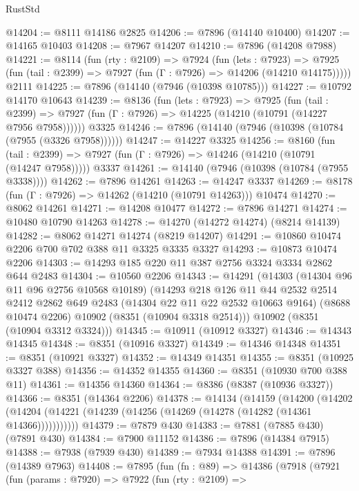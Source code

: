 \begin{lexlean}{RustStd}
\begin{coremodule}
{\begin{coremodule}
{{{{{{{{{{{{{{{{{{{{{{{{{{{{{{{{{{{{{{{{{{{{{{{{{{@14204 := @8111 @14186 @2825
@14206 := @7896 (@14140 @10400)
@14207 := @14165 @10403
@14208 := @7967 @14207
@14210 := @7896 (@14208 @7988)
@14221 := @8114
    (fun (rty : @2109) =>
    @7924
      (fun (lets : @7923) =>
      @7925 (fun (tail : @2399) => @7927 (fun (Γ : @7926) => @14206 (@14210 @14175)))))
    @2111
@14225 := @7896 (@14140 (@7946 (@10398 @10785)))
@14227 := @10792 @14170 @10643
@14239 := @8136
    (fun (lets : @7923) =>
    @7925
      (fun (tail : @2399) =>
      @7927 (fun (Γ : @7926) => @14225 (@14210 (@10791 (@14227 @7956 @7958))))))
    @3325
@14246 := @7896 (@14140 (@7946 (@10398 (@10784 (@7955 (@3326 @7958))))))
@14247 := @14227 @3325
@14256 := @8160
    (fun (tail : @2399) => @7927 (fun (Γ : @7926) => @14246 (@14210 (@10791 (@14247 @7958)))))
    @3337
@14261 := @14140 (@7946 (@10398 (@10784 (@7955 @3338))))
@14262 := @7896 @14261
@14263 := @14247 @3337
@14269 := @8178 (fun (Γ : @7926) => @14262 (@14210 (@10791 @14263))) @10474
@14270 := @8062 @14261
@14271 := @14208 @10477
@14272 := @7896 @14271
@14274 := @10480 @10790 @14263
@14278 := @14270 (@14272 @14274) (@8214 @14139)
@14282 := @8062 @14271 @14274 (@8219 @14207)
@14291 := @10860 @10474 @2206 @700 @702 @388 @11 @3325 @3335 @3327
@14293 := @10873 @10474 @2206
@14303 := @14293 @185 @220 @11 @387 @2756 @3324 @3334 @2862 @644 @2483
@14304 := @10560 @2206
@14343 := @14291
    (@14303
      (@14304 @96 @11 @96 @2756 @10568 @10189)
      (@14293
        @218
        @126
        @11
        @44
        @2532
        @2514
        @2412
        @2862
        @649
        @2483
        (@14304 @22 @11 @22 @2532 @10663 @9164)
        (@8688 @10474 @2206)
        @10902
        (@8351 (@10904 @3318 @2514)))
      @10902
      (@8351 (@10904 @3312 @3324)))
@14345 := @10911 (@10912 @3327)
@14346 := @14343 @14345
@14348 := @8351 (@10916 @3327)
@14349 := @14346 @14348
@14351 := @8351 (@10921 @3327)
@14352 := @14349 @14351
@14355 := @8351 (@10925 @3327 @388)
@14356 := @14352 @14355
@14360 := @8351 (@10930 @700 @388 @11)
@14361 := @14356 @14360
@14364 := @8386 (@8387 (@10936 @3327))
@14366 := @8351 (@14364 @2206)
@14378 := @14134
    (@14159
      (@14200
        (@14202 (@14204 (@14221 (@14239 (@14256 (@14269 (@14278 (@14282 (@14361 @14366)))))))))))
@14379 := @7879 @430
@14383 := @7881 (@7885 @430) (@7891 @430)
@14384 := @7900 @11152
@14386 := @7896 (@14384 @7915)
@14388 := @7938 (@7939 @430)
@14389 := @7934 @14388
@14391 := @7896 (@14389 @7963)
@14408 := @7895
    (fun (fn : @89) =>
    @14386
      (@7918
        (@7921
          (fun (params : @7920) =>
          @7922
            (fun (rty : @2109) =>
}}}}}}}}}}}}}}}}}}}}}}}}}}}}}}}}}}}}}}}}}}}}}}}}}}
\end{coremodule}}
\end{coremodule}
\end{lexlean}
